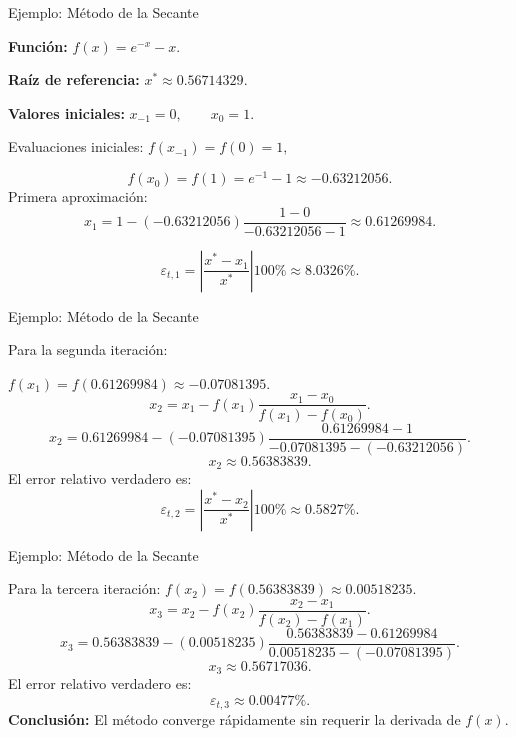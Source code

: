 \documentclass[../../main.tex]{subfiles}
\begin{document}

\begin{frame}{Ejemplo: Método de la Secante}

\textbf{Función:}
\(
f(x)=e^{-x}-x.
\)

\textbf{Raíz de referencia:}
\(
x^*\approx0.56714329.
\)

\textbf{Valores iniciales:}
\(
x_{-1}=0,
\qquad
x_0=1.
\)

Evaluaciones iniciales:
\(
f(x_{-1})=f(0)=1,
\)

\[
f(x_0)=f(1)=e^{-1}-1\approx-0.63212056.
\]
Primera aproximación:
\[
x_1
=
1
-
(-0.63212056)
\frac{1-0}
{-0.63212056-1}
\approx0.61269984.
\]

\[
\varepsilon_{t,1}
=
\left|
\frac{x^*-x_1}{x^*}
\right|100\%
\approx8.0326\%.
\]

\end{frame}



\begin{frame}{Ejemplo: Método de la Secante}

Para la segunda iteración:

\(
f(x_1)
=
f(0.61269984)
\approx-0.07081395.
\)
\[
x_2
=
x_1
-
f(x_1)
\frac{x_1-x_0}
{f(x_1)-f(x_0)}.
\]
\[
x_2
=
0.61269984
-
(-0.07081395)
\frac{0.61269984-1}
{-0.07081395-(-0.63212056)}.
\]
\[
x_2\approx0.56383839.
\]
El error relativo verdadero es:
\[
\varepsilon_{t,2}
=
\left|
\frac{x^*-x_2}{x^*}
\right|100\%
\approx0.5827\%.
\]

\end{frame}



\begin{frame}{Ejemplo: Método de la Secante}

Para la tercera iteración:
\(
f(x_2)
=
f(0.56383839)
\approx0.00518235.
\)
\[
x_3
=
x_2
-
f(x_2)
\frac{x_2-x_1}
{f(x_2)-f(x_1)}.
\]
\[
x_3
=
0.56383839
-
(0.00518235)
\frac{0.56383839-0.61269984}
{0.00518235-(-0.07081395)}.
\]
\[
x_3\approx0.56717036.
\]
El error relativo verdadero es:
\[
\varepsilon_{t,3}
\approx0.00477\%.
\]
\textbf{Conclusión:}
El método converge rápidamente sin requerir la derivada de \(f(x)\).

\end{frame}
\end{document}

